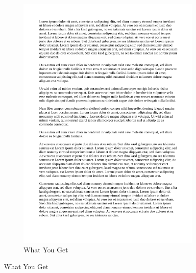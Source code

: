 \documentclass[18pt]{beamer}
\begin{document}
\begin{frame}
\begin{figure}
\begin{subfigure}{0.5\textwidth}
			\end{subfigure}%
			\begin{subfigure}{0.5\textwidth}
				\centering
				\caption{\small What You Get}
				\includegraphics[scale=0.2]{pics/tut1/wysiwyg.png}
			\end{subfigure}
		\end{figure}
	\end{frame}
\end{document}
